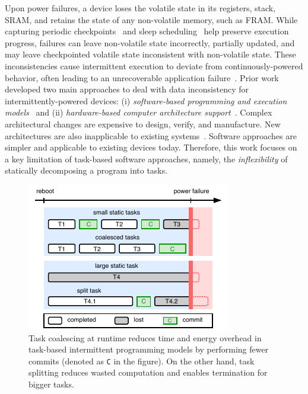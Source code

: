 Upon power failures, a device loses the volatile
state in its registers, stack, SRAM, and retains the state of any non-volatile
memory, such as FRAM. While capturing periodic
checkpoints~\cite{mementos,quickrecall} and sleep
scheduling~\cite{dewdrop,hibernus,hibernusplusplus} help preserve execution
progress, failures can leave non-volatile state incorrectly, partially updated,
and may leave checkpointed volatile state inconsistent with non-volatile state.
These inconsistencies cause intermittent execution to deviate from
continuously-powered behavior, often leading to an unrecoverable
application failure~\cite{dino,edb}. Prior work developed two main approaches to deal with data inconsistency for
intermittently-powered devices: (i) \emph{software-based programming and
execution models}~\cite{dino,ratchet,chain,alpaca} and (ii)
\emph{hardware-based computer architecture
support}~\cite{hicks_isca_2017,idetic,nvp}. Complex architectural changes are
expensive to design, verify, and manufacture. New architectures are also
inapplicable to existing systems~\cite{hicks_isca_2017,nvp}. Software
approaches are simpler and applicable to existing devices today. Therefore, this work focuses on a key limitation of task-based software approaches, namely, the {\em inflexibility} of statically decomposing a program into tasks.
%
\begin{figure}
    \centering
    \includegraphics[width=0.7\columnwidth]{figures/intro-figure-vert.pdf}
    \caption{Task coalescing at runtime reduces time and energy overhead in task-based intermittent programming models by performing fewer commits (denoted as \texttt{C} in the figure). On the other hand, task splitting reduces wasted computation and enables termination for bigger tasks.}
    \label{fig:coalesce}
\end{figure}
%

